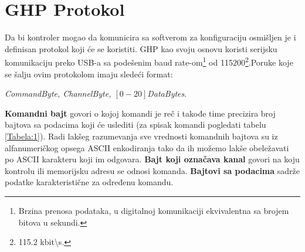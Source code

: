\documentclass[12pt,oneside]{memoir}
\begin{document}
	\chapter{GHP Protokol}
	Da bi kontroler mogao da komunicira sa softverom za konfiguraciju osmišljen je i definisan protokol koji će se koristiti.
	GHP kao svoju osnovu koristi serijsku komunikaciju preko USB-a sa podešenim baud rate-om\footnote{Brzina prenosa podataka, u digitalnoj komunikaciji ekvivalentna sa brojem bitova u sekundi.} od 115200\footnote{115.2 kbit\textbackslash s.}.Poruke koje se šalju ovim protokolom imaju sledeći format:\newline
	\centerline{\textit{CommandByte, ChannelByte, $\left[0-20\right]$DataBytes}.}\newline
	\textbf{Komandni bajt} govori o kojoj komandi je reč i takođe time precizira broj bajtova sa podacima koji će uslediti (za spisak komandi pogledati tabelu \ref{Tabela:1}). Radi lakšeg razumevanja sve vrednosti komandnih bajtova su iz alfanumeričkog opsega ASCII enkodiranja tako da ih možemo lakše obeležavati po ASCII karakteru koji im odgovara. \newline
	\textbf{Bajt koji označava kanal} govori na koju kontrolu ili memorijsku adresu se odnosi komanda.\newline
	\textbf{Bajtovi sa podacima} sadrže podatke karakteristične za određenu komandu.\newline
\end{document}
